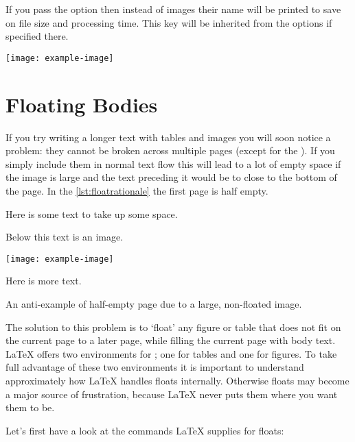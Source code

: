 If you pass the  option then instead of images their name will be
printed to save on file size and processing time. This key will be inherited
from the  options if specified there.
\begin{example}
\texttt{[image: example-image]}
\end{example}

\section{Floating Bodies}
If you try writing a longer text with tables and images you will soon notice a
problem: they cannot be broken across multiple pages (except for the
). If you simply include them in normal text flow this will lead
to a lot of empty space if the image is large and the text preceding it would
be to close to the bottom of the page. In the \autoref{lst:floatrationale} the
first page is half empty.
\begin{listing}
  \begin{lined}{11cm}
    \begin{example}[standalone, paperheight=4cm, to_page=2, vertical_pages]
\usepackage{graphicx} %
\usepackage{ragged2e} %
\geometry{includefoot} %
Here is some text
to take up some space.

Below this text is an image.

\begin{Center}
  \texttt{[image: example-image]}
\end{Center}

Here is more text.
\end{example}
  \end{lined}
  \caption{An anti-example of half-empty page due to a large, non-floated
    image.}\label{lst:floatrationale}
\end{listing}

The solution to this problem is to `float' any figure or table that
does not fit on the current page to a later page, while filling the
current page with body text. \LaTeX{} offers two environments for
; one for tables and  one for figures.  To
take full advantage of these two environments it is important to
understand approximately how \LaTeX{} handles floats internally.
Otherwise floats may become a major source of frustration, because
\LaTeX{} never puts them where you want them to be.

Let's first have a look at the commands \LaTeX{} supplies
for floats:

